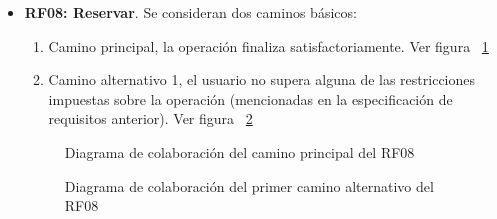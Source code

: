 \begin{itemize}
	\FloatBarrier
	\item \textbf{RF08: Reservar}. Se consideran dos caminos básicos: 
	\begin{enumerate}
		\item Camino principal, la operación finaliza satisfactoriamente. Ver figura ~\ref{fig:diagramaColaboracion_RF08_1}
		\item Camino alternativo 1, el usuario no supera alguna de las restricciones impuestas sobre la operación (mencionadas en la especificación de requisitos anterior). Ver figura ~\ref{fig:diagramaColaboracion_RF08_2}
	\end{enumerate}
	\begin{figure} [!htb]
		\centering
		\caption{Diagrama de colaboración del camino principal del RF08}
		\label{fig:diagramaColaboracion_RF08_1}
	\end{figure}
	\begin{figure} [!htb]
		\centering
		\caption{Diagrama de colaboración del primer camino alternativo del RF08}
		\label{fig:diagramaColaboracion_RF08_2}
	\end{figure}
	

\end{itemize}
